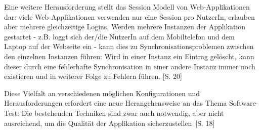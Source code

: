 \documentclass[a4paper,bibtotoc,oneside]{scrbook}
\begin{document}
Eine weitere Herausforderung stellt das Session Modell von Web-Applikationen dar: viele Web-Applikationen verwenden nur eine Session pro NutzerIn, erlauben aber mehrere gleichzeitige Logins. Werden mehrere Instanzen der Applikation gestartet - z.B. loggt sich der/die NutzerIn auf dem Mobiltelefon und dem Laptop auf der Webseite ein - kann dies zu Synchronisationsproblemen zwischen den einzelnen Instanzen führen: Wird in einer Instanz ein Eintrag gelöscht, kann dieser durch eine fehlerhafte Synchronisation in einer andere Instanz immer noch existieren und in weiterer Folge zu Fehlern führen. \cite{testing_apps_on_web}[S. 20]

Diese Vielfalt an verschiedenen möglichen Konfigurationen und Herausforderungen erfordert eine neue Herangehensweise an das Thema Software-Test: Die bestehenden Techniken sind \glqq zwar auch notwendig, aber nicht ausreichend, um die Qualität der Applikation sicherzustellen\grqq\ \cite{eval_automat_webapp_test}[S. 18]







%
%
\end{document}
